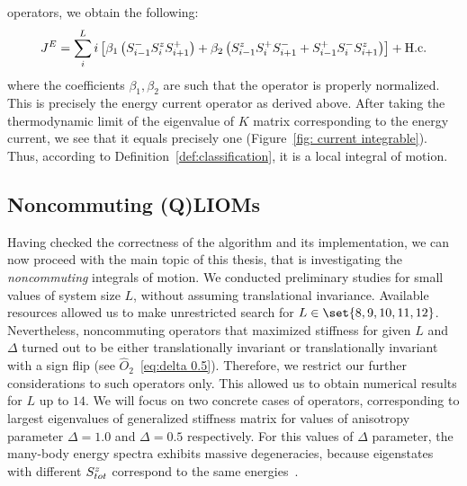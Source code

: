operators, we obtain the following:
\begin{equation}
    J^E = \sum_i^L i\left[\beta_1 \left(S^{-}_{i-1}S^{z}_{i}S^{+}_{i+1}\right) + \beta_2 \left(S^{z}_{i-1}S^{+}_{i}S^{-}_{i+1}+S^{+}_{i-1}S^{-}_{i}S^{z}_{i+1}\right)\right] + \text{H.c.}
\end{equation}
where the coefficients \(\beta_1,\beta_2\) are such that the operator is properly
normalized. This is precisely the energy current operator as derived above.
After taking the thermodynamic limit of the eigenvalue of \(K\) matrix 
corresponding to the energy current, we see that it equals precisely one (Figure~\ref{fig: current integrable}).
Thus, according to Definition~\ref{def:classification}, it is a local integral of motion. 

\subsection{Noncommuting (Q)LIOMs}
Having checked the correctness of the algorithm and its implementation, we can now proceed with the
main topic of this thesis, that is investigating the \textit{noncommuting} integrals of motion. 
We conducted preliminary studies for small values of system size \(L\), without assuming
translational invariance. Available resources allowed us to make unrestricted search for
 \(L \in \set{8,9,10,11,12}\). Nevertheless, noncommuting operators that maximized stiffness for given 
 \(L\) and \(\Delta \) turned out to be either translationally invariant or translationally invariant with
 a sign flip (see \(\hat{O}_2\)~\eqref{eq:delta 0.5}). Therefore, we restrict our further 
considerations to such operators only. This allowed us to obtain numerical
results for \(L\) up to \(14\). We will focus on two concrete cases of operators, corresponding
to largest eigenvalues of generalized stiffness matrix for values of anisotropy
parameter \(\Delta=1.0\) and \(\Delta=0.5\) respectively. For this values of
\( \Delta \) parameter, the many-body energy spectra exhibits massive degeneracies, because
eigenstates with different \(S^{z}_{tot}\) correspond to the same energies~\autocite{Fagotti2014,Mierzejewski2021}.

